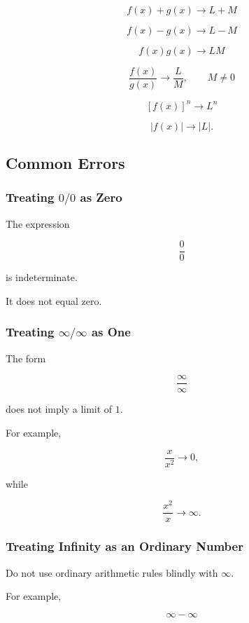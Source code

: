 \[
\boxed{
f(x)+g(x)
\to
L+M
}
\]

\[
\boxed{
f(x)-g(x)
\to
L-M
}
\]

\[
\boxed{
f(x)g(x)
\to
LM
}
\]

\[
\boxed{
\frac{f(x)}{g(x)}
\to
\frac{L}{M},
\qquad
M\neq0
}
\]

\[
\boxed{
[f(x)]^n
\to
L^n
}
\]

\[
\boxed{
|f(x)|
\to
|L|.
}
\]

\subsection{Common Errors}
\label{subsec:limit-laws-common-errors}

\subsubsection{Treating \(0/0\) as Zero}

The expression

\[
\boxed{
\frac00
}
\]

is indeterminate.

It does not equal zero.

\subsubsection{Treating \(\infty/\infty\) as One}

The form

\[
\boxed{
\frac{\infty}{\infty}
}
\]

does not imply a limit of \(1\).

For example,

\[
\frac{x}{x^2}
\to0,
\]

while

\[
\frac{x^2}{x}
\to\infty.
\]

\subsubsection{Treating Infinity as an Ordinary Number}

Do not use ordinary arithmetic rules blindly with \(\infty\).

For example,

\[
\infty-\infty
\]


